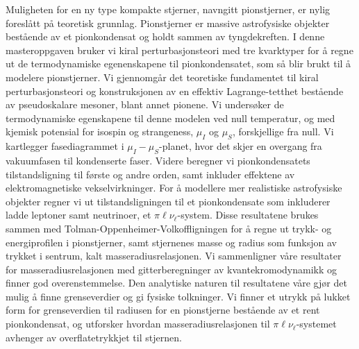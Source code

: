 \vspace*{1.5cm}
Muligheten for en ny type kompakte stjerner, navngitt pionstjerner, er nylig foreslått på teoretisk grunnlag.
Pionstjerner er massive astrofysiske objekter bestående av et pionkondensat og holdt sammen av tyngdekreften.
I denne masteroppgaven bruker vi kiral perturbasjonsteori med tre kvarktyper for å regne ut de termodynamiske egenenskapene til pionkondensatet, som så blir brukt til å modelere pionstjerner.
Vi gjennomgår det teoretiske fundamentet til kiral perturbasjonsteori og konstruksjonen av en effektiv Lagrange-tetthet bestående av pseudoskalare mesoner, blant annet pionene.
Vi undersøker de termodynamiske egenskapene til denne modelen ved null temperatur, og med kjemisk potensial for isospin og strangeness, $\mu_I$ og $\mu_S$, forskjellige fra null.
Vi kartlegger fasediagrammet i $\mu_I-\mu_S$-planet, hvor det skjer en overgang fra vakuumfasen til kondenserte faser.
Videre beregner vi pionkondensatets tilstandsligning til første og andre orden, samt inkluder effektene av elektromagnetiske vekselvirkninger.
For å modellere mer realistiske astrofysiske objekter regner vi ut tilstandsligningen til et pionkondensate som inkluderer ladde leptoner samt neutrinoer, et $\pi\ell\nu_\ell$-system.
Disse resultatene brukes sammen med Tolman-Oppenheimer-Volkoffligningen for å regne ut trykk- og energiprofilen i pionstjerner, samt stjernenes masse og radius som funksjon av trykket i sentrum, kalt masseradiusrelasjonen.
Vi sammenligner våre resultater for masseradiusrelasjonen med gitterberegninger av kvantekromodynamikk og finner god overenstemmelse.
Den analytiske naturen til resultatene våre gjør det mulig å finne grenseverdier og gi fysiske tolkninger.
Vi finner et utrykk på lukket form for grenseverdien til radiusen for en pionstjerne bestående av et rent pionkondensat, og utforsker hvordan masseradiusrelasjonen til $\pi\ell\nu_\ell$-systemet avhenger av overflatetrykkjet til stjernen.
